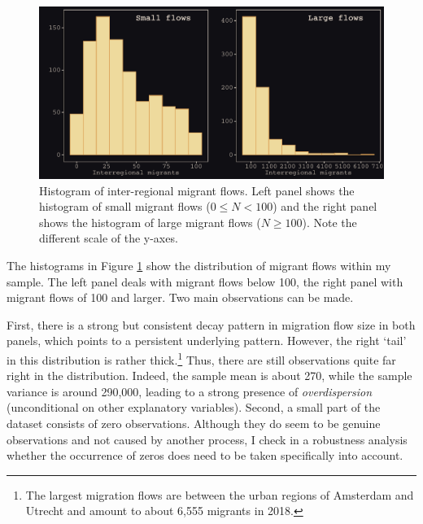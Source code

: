\documentclass[fleqn,10pt]{SelfArx} %
\begin{document}
{{ \begin{figure}[ht]\centering %
   \includegraphics[width=1.0\linewidth]{./../../fig/hist_mig_corop.pdf}
          \caption{Histogram of inter-regional migrant flows. Left panel shows the histogram of
small migrant flows ($0 \leq N < 100$) and the right panel shows the histogram of
large migrant flows ($N \geq 100$). Note the different scale of the y-axes.}
          \label{fig:hist_mig_corop}
        \end{figure}

The histograms in Figure \ref{fig:hist_mig_corop} show the distribution of
migrant flows within my sample. The left panel deals with migrant flows below
100, the right panel with migrant flows of 100 and larger. Two main observations
can be made.

First, there is a strong but consistent decay pattern in migration flow size in
both panels, which points to a persistent underlying pattern. However, the right
`tail' in this distribution is rather thick.\footnote{The largest migration
  flows are between the urban regions of Amsterdam and Utrecht and amount to about
  6,555 migrants in 2018.} Thus, there are still observations quite far right in
the distribution. Indeed, the sample mean is about 270, while the sample
variance is around 290,000, leading to a strong presence of
\emph{overdispersion} (unconditional on other explanatory variables). Second, a
small part of the dataset consists of zero observations. Although they do seem
to be genuine observations and not caused by another process, I check in a
robustness analysis whether the occurrence of zeros does need to be taken
specifically into account.

}}
\end{document}
